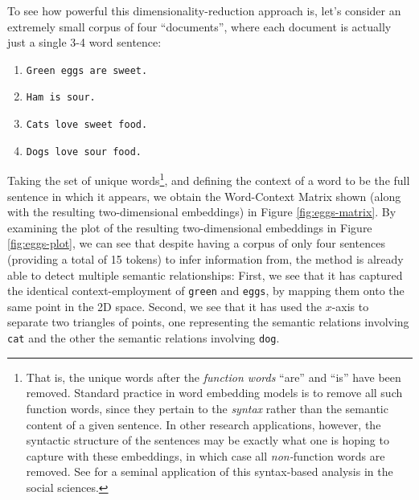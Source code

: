\documentclass[11pt]{article}
\begin{document}
To see how powerful this dimensionality-reduction approach is, let's consider an extremely small corpus of four ``documents'', where each document is actually just a single 3-4 word sentence:
\begin{enumerate}
	\item \texttt{Green eggs are sweet.}
	\item \texttt{Ham is sour.}
	\item \texttt{Cats love sweet food.}
	\item \texttt{Dogs love sour food.}
\end{enumerate}
Taking the set of unique words\footnote{That is, the unique words after the \textit{function words} ``are'' and ``is'' have been removed. Standard practice in word embedding models is to remove all such function words, since they pertain to the \textit{syntax} rather than the semantic content of a given sentence. In other research applications, however, the syntactic structure of the sentences may be exactly what one is hoping to capture with these embeddings, in which case all \textit{non-}function words are removed. See \cite{mosteller_inference_1964} for a seminal application of this syntax-based analysis in the social sciences.}, and defining the context of a word to be the full sentence in which it appears, we obtain the Word-Context Matrix shown (along with the resulting two-dimensional embeddings) in Figure \ref{fig:eggs-matrix}. By examining the plot of the resulting two-dimensional embeddings in Figure \ref{fig:eggs-plot}, we can see that despite having a corpus of only four sentences (providing a total of 15 tokens) to infer information from, the method is already able to detect multiple semantic relationships: First, we see that it has captured the identical context-employment of \texttt{green} and \texttt{eggs}, by mapping them onto the same point in the 2D space. Second, we see that it has used the $x$-axis to separate two triangles of points, one representing the semantic relations involving \texttt{cat} and the other the semantic relations involving \texttt{dog}.
\end{document}
